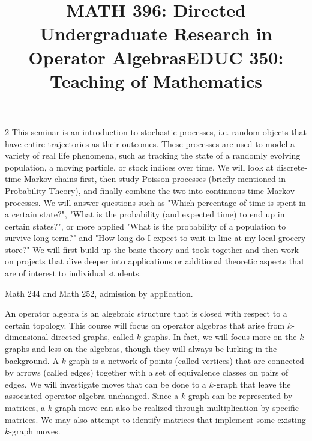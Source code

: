 \documentclass[12pt]{article}
\newcommand{\bolder}{\textbf}
\begin{document}
\begin{multicols}{2}
This seminar is an introduction to stochastic processes, i.e. random objects that have entire trajectories as their outcomes. These processes are used to model a variety of real life phenomena, such as tracking the state of a randomly evolving population, a moving particle, or stock indices over time.  We will look at discrete-time Markov chains first, then study Poisson processes (briefly mentioned in Probability Theory), and finally combine the two into continuous-time Markov processes. We will answer questions such as "Which percentage of time is spent in a certain state?", "What is the probability (and expected time) to end up in certain states?", or more applied "What is the probability of a population to survive long-term?" and "How long do I expect to wait in line at my local grocery store?"  We will first build up the basic theory and tools together and then work on projects that dive deeper into applications or additional theoretic aspects that are of interest to individual students. 


\begin{tcolorbox}[colback=white, colframe=black]
    \begin{center}
    \title{{\large \bolder{MATH 396: Directed Undergraduate Research in Operator Algebras}}}
    \end{center}
\end{tcolorbox}

 Math 244 and Math 252, admission by application.

An operator algebra is an algebraic structure that is closed with respect to a certain topology. This course will focus on operator algebras that arise from $k$-dimensional directed graphs, called $k$-graphs. In fact, we will focus more on the $k$-graphs and less on the algebras, though they will always be lurking in the background. A $k$-graph is a network of points (called vertices) that are connected by arrows (called edges) together with a set of equivalence classes on pairs of edges. We will investigate moves that can be done to a $k$-graph that leave the associated operator algebra unchanged. Since a $k$-graph can be represented by matrices, a $k$-graph move can also be realized through multiplication by specific matrices. We may also attempt to identify matrices that implement some existing $k$-graph moves.


\begin{tcolorbox}[colback=white, colframe=black]
    \begin{center}
    \title{{\large \bolder{EDUC 350: Teaching of Mathematics}}}
    \end{center}
\end{tcolorbox}


\end{multicols}
\end{document}
